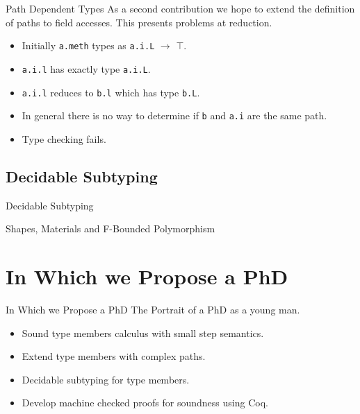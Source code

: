 \documentclass[dvipsnames]{beamer}
\begin{document}
\begin{frame}{Path Dependent Types}
As a second contribution we hope to extend the definition of paths to field accesses. This presents problems at reduction.
\begin{block}{ }
\usebox{\tmExPaths}
\end{block}
\begin{itemize}
\item
Initially \texttt{a.meth} types as \texttt{a.i.L} $\rightarrow$ $\top$.
\item
\texttt{a.i.l} has exactly type \texttt{a.i.L}.
\item
\texttt{a.i.l} reduces to \texttt{b.l} which has type \texttt{b.L}.
\item
In general there is no way to determine if \texttt{b} and \texttt{a.i} are the same path.
\item
Type checking fails.
\end{itemize}
\end{frame}

\subsection{Decidable Subtyping}

\begin{frame}{Decidable Subtyping}
\end{frame}

\begin{frame}{Shapes, Materials and F-Bounded Polymorphism}
\end{frame}

\section{In Which we Propose a PhD}

\begin{frame}{In Which we Propose a PhD}
The Portrait of a PhD as a young man.
\begin{itemize}
\item
Sound type members calculus with small step semantics.
\item
Extend type members with complex paths.
\item
Decidable subtyping for type members.
\item
Develop machine checked proofs for soundness using Coq.
\end{itemize}
\end{frame}
\end{document}
